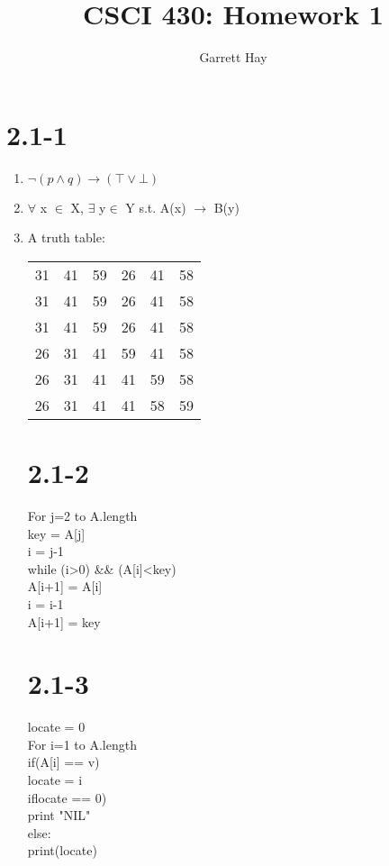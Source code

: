 \documentclass[12pt]{article}
\author{Garrett Hay}
\title{CSCI 430: Homework 1}
\begin{document}
\maketitle

\section*{2.1-1}
\noindent

\begin{enumerate}
  \item $ \lnot (p \land q) \rightarrow (\top \lor \bot) $

  \item  $\forall$ x $\in$ X, $\exists$ y$\in$ Y s.t. A(x) $\rightarrow$ B(y)
    
  \item A truth table:
    
    \begin{tabular}{| c | c | c | c | c | c |} %
      \hline %
      31 & 41 & 59 & 26 & 41 & 58 \\
      31 & 41 & 59 & 26 & 41 & 58 \\
      31 & 41 & 59 & 26 & 41 & 58 \\
      26 & 31 & 41 & 59 & 41 & 58 \\
      26 & 31 & 41 & 41 & 59 & 58 \\
      26 & 31 & 41 & 41 & 58 & 59 \\
      \hline
    \end{tabular}
    
    \section*{2.1-2}
    \noindent
    For j=2 to A.length\\
    	key = A[j]\\
    	i = j-1\\
    	while (i>0) && (A[i]<key)\\
     		A[i+1] = A[i]\\
     		i = i-1\\
     	A[i+1] = key\\
    \section{2.1-3}
    \noindent
    locate = 0\\
    For i=1 to A.length\\
    	if(A[i] == v)\\
    		locate = i\\
    if{locate == 0)\\
    	print "NIL"\\
    else:\\
    	print(locate)\\
    \\
}
\end{enumerate}
\end{document}
